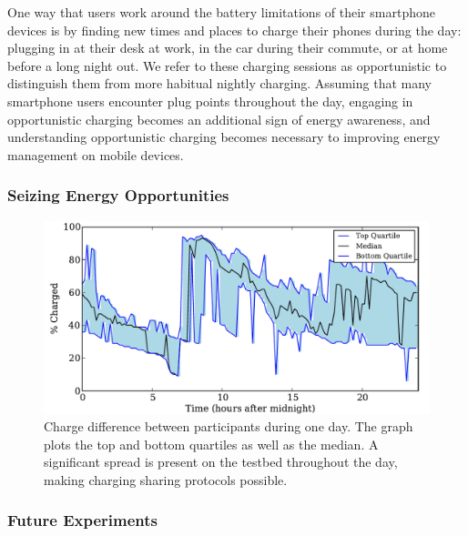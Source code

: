 One way that users work around the battery limitations of their smartphone
devices is by finding new times and places to charge their phones during the
day: plugging in at their desk at work, in the car during their commute, or
at home before a long night out. We refer to these charging sessions as
opportunistic to distinguish them from more habitual nightly charging.
Assuming that many smartphone users encounter plug points throughout the day,
engaging in opportunistic charging becomes an additional sign of energy
awareness, and understanding opportunistic charging becomes necessary to
improving energy management on mobile devices.

\subsubsection{Seizing Energy Opportunities}

\begin{figure}[t]
\includegraphics[width=\textwidth]{./figures/power/opportunistic_charging/max_difference/graph.pdf}
\caption{Charge difference between participants during one day.
\textnormal{The graph plots the top and bottom quartiles as well as the
median. A significant spread is present on the testbed throughout the day,
making charging sharing protocols possible.}}
\end{figure}

\subsubsection{Future Experiments}

